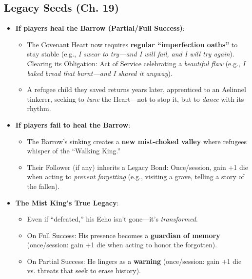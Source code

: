 \documentclass[12pt]{article}
\begin{document}
\subsection{Legacy Seeds (Ch. 19)}
\begin{itemize}
  \item \textbf{If players heal the Barrow (Partial/Full Success)}:
  \begin{itemize}
    \item The Covenant Heart now requires \textbf{regular ``imperfection oaths''} to stay stable (e.g., \textit{I swear to try---and I will fail, and I will try again}). Clearing its Obligation: Act of Service celebrating a \textit{beautiful flaw} (e.g., \textit{I baked bread that burnt---and I shared it anyway}).
    \item A refugee child they saved returns years later, apprenticed to an Aelinnel tinkerer, seeking to \textit{tune} the Heart---not to stop it, but to \textit{dance} with its rhythm.
  \end{itemize}
  \item \textbf{If players fail to heal the Barrow}:
  \begin{itemize}
    \item The Barrow's sinking creates a \textbf{new mist-choked valley} where refugees whisper of the ``Walking King.''
    \item Their Follower (if any) inherits a Legacy Bond: Once/session, gain +1 die when acting to \textit{prevent forgetting} (e.g., visiting a grave, telling a story of the fallen).
  \end{itemize}
  \item \textbf{The Mist King's True Legacy}:
  \begin{itemize}
    \item Even if ``defeated,'' his Echo isn't gone---it's \textit{transformed}.
    \item On Full Success: His presence becomes a \textbf{guardian of memory} (once/session: gain +1 die when acting to honor the forgotten).
    \item On Partial Success: He lingers as a \textbf{warning} (once/session: gain +1 die vs. threats that seek to erase history).
  \end{itemize}
\end{itemize}
\end{document}

